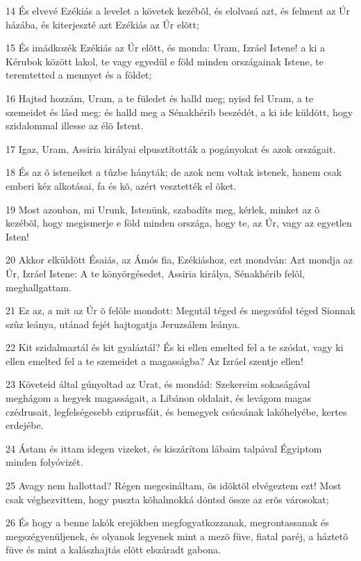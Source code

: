 \par 14 És elvevé Ezékiás a levelet a követek kezébõl, és elolvasá azt, és felment az Úr házába, és kiterjeszté azt Ezékiás az Úr elõtt;
\par 15 És imádkozék Ezékiás az Úr elõtt, és monda: Uram, Izráel Istene! a ki a Kérubok között lakol, te vagy egyedül e föld minden országainak Istene, te teremtetted a mennyet és a földet;
\par 16 Hajtsd hozzám, Uram, a te füledet és halld meg; nyisd fel Uram, a te szemeidet és lásd meg: és halld meg a Sénakhérib beszédét, a ki ide küldött, hogy szidalommal illesse az élõ Istent.
\par 17 Igaz, Uram, Assiria királyai elpusztították a pogányokat és azok országait.
\par 18 És az õ isteneiket a tûzbe hányták; de azok nem voltak istenek, hanem csak emberi kéz alkotásai, fa és kõ, azért vesztették el õket.
\par 19 Most azonban, mi Urunk, Istenünk, szabadíts meg, kérlek, minket az õ kezébõl, hogy megismerje e föld minden országa, hogy te, az Úr, vagy az egyetlen Isten!
\par 20 Akkor elküldött Ésaiás, az Ámós fia, Ezékiáshoz, ezt mondván: Azt mondja az Úr, Izráel Istene: A te könyörgésedet, Assiria királya, Sénakhérib felõl, meghallgattam.
\par 21 Ez az, a mit az Úr õ felõle mondott: Megutál téged és megcsúfol téged Sionnak szûz leánya, utánad fejét hajtogatja Jeruzsálem leánya.
\par 22 Kit szidalmaztál és kit gyaláztál? És ki ellen emelted fel a te szódat, vagy ki ellen emelted fel a te szemeidet a magasságba? Az Izráel szentje ellen!
\par 23 Követeid által gúnyoltad az Urat, és mondád: Szekereim sokaságával meghágom a hegyek magasságait, a Libánon oldalait, és levágom magas czédrusait, legfelségesebb cziprusfáit, és bemegyek csúcsának lakóhelyébe, kertes erdejébe.
\par 24 Ástam és ittam idegen vizeket, és kiszárítom lábaim talpával Égyiptom minden folyóvizét.
\par 25 Avagy nem hallottad? Régen megcsináltam, õs idõktõl elvégeztem ezt! Most csak véghezvittem, hogy puszta kõhalmokká döntsd össze az erõs városokat;
\par 26 És hogy a benne lakók erejökben megfogyatkozzanak, megrontassanak és megszégyenüljenek, és olyanok legyenek mint a mezõ füve, fiatal paréj, a háztetõ füve és mint a kalászhajtás elõtt elszáradt gabona.
